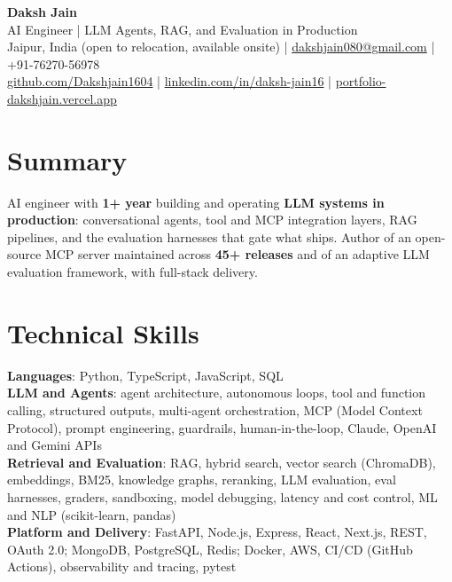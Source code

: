 \documentclass[10pt,letterpaper]{article}
\begin{document}
\begin{center}
  {\LARGE\bfseries Daksh Jain}\\[1pt]
  AI Engineer | LLM Agents, RAG, and Evaluation in Production\\[1pt]
  Jaipur, India (open to relocation, available onsite) |
  \href{mailto:dakshjain080@gmail.com}{dakshjain080@gmail.com} |
  +91-76270-56978\\[1pt]
  \href{https://github.com/Dakshjain1604}{github.com/Dakshjain1604} |
  \href{https://linkedin.com/in/daksh-jain16}{linkedin.com/in/daksh-jain16} |
  \href{https://portfolio-dakshjain.vercel.app}{portfolio-dakshjain.vercel.app}
\end{center}

\section*{Summary}

AI engineer with \textbf{1+ year} building and operating \textbf{LLM systems in production}:
conversational agents, tool and MCP integration layers, RAG pipelines, and the
evaluation harnesses that gate what ships. Author of an open-source MCP server maintained
across \textbf{45+ releases} and of an adaptive LLM evaluation framework, with full-stack delivery.

\section*{Technical Skills}

\textbf{Languages}: Python, TypeScript, JavaScript, SQL\\[1pt]
\textbf{LLM and Agents}: agent architecture, autonomous loops, tool and function calling, structured outputs,
multi-agent orchestration, MCP (Model Context Protocol), prompt engineering, guardrails, human-in-the-loop,
Claude, OpenAI and Gemini APIs\\[1pt]
\textbf{Retrieval and Evaluation}: RAG, hybrid search, vector search (ChromaDB), embeddings, BM25,
knowledge graphs, reranking, LLM evaluation, eval harnesses, graders, sandboxing, model debugging,
latency and cost control, ML and NLP (scikit-learn, pandas)\\[1pt]
\textbf{Platform and Delivery}: FastAPI, Node.js, Express, React, Next.js, REST, OAuth 2.0; MongoDB,
PostgreSQL, Redis; Docker, AWS, CI/CD (GitHub Actions), observability and tracing, pytest
\end{document}

